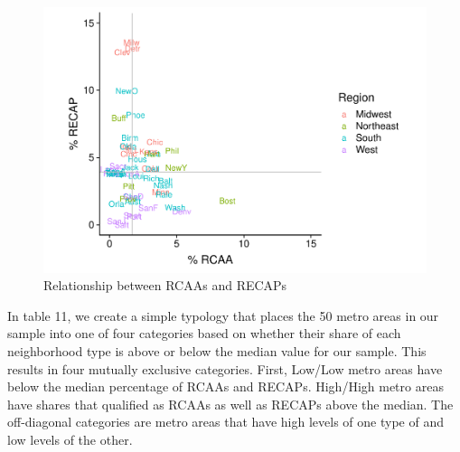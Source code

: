 \documentclass[11pt,]{article}
\begin{document}
\begin{figure}
\centering
\includegraphics{GDW-RCAA-2019_files/figure-latex/fig4-1.pdf}
\caption{Relationship between RCAAs and RECAPs}
\end{figure}

In table 11, we create a simple typology that places the 50 metro areas
in our sample into one of four categories based on whether their share
of each neighborhood type is above or below the median value for our
sample. This results in four mutually exclusive categories. First,
Low/Low metro areas have below the median percentage of RCAAs and
RECAPs. High/High metro areas have shares that qualified as RCAAs as
well as RECAPs above the median. The off-diagonal categories are metro
areas that have high levels of one type of and low levels of the other.
\end{document}
